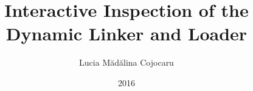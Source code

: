 \title{Interactive Inspection of the Dynamic Linker and Loader}
\author{Lucia Mădălina Cojocaru}
\date{2016}


\newcommand{\project}{DynInspector}
\newcommand{\gui}{graphical user interface}


